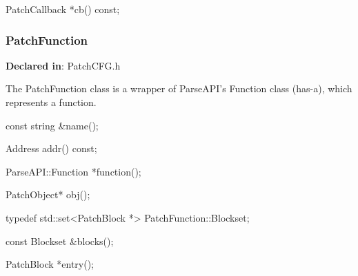 
\begin{apient}
PatchCallback *cb() const;
\end{apient}



\subsubsection{PatchFunction}
\label{sec-3.2.9}

\textbf{Declared in}: PatchCFG.h

The PatchFunction class is a wrapper of ParseAPI's Function class (has-a), which
represents a function.

\begin{apient}
const string &name();
\end{apient}



\begin{apient}
Address addr() const;
\end{apient}



\begin{apient}
ParseAPI::Function *function();
\end{apient}




\begin{apient}
PatchObject* obj();
\end{apient}


\begin{apient}
typedef std::set<PatchBlock *> PatchFunction::Blockset;

const Blockset &blocks();
\end{apient}



\begin{apient}
PatchBlock *entry();
\end{apient}


